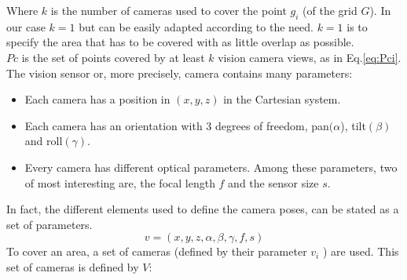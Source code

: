 \noindent Where $k$ is the number of cameras used to cover the point $g_i$ (of the grid $G$). In our case $k=1$ but can be easily adapted according to the need. $k=1$ is to specify the area that has to be covered with as little overlap as possible.\\
$Pc$ is the set of points covered by at least $k$ vision camera views, as in Eq.\eqref{eq:Pci}. \\

The vision sensor or, more precisely, camera contains many parameters:
\begin{itemize}
\item Each camera has a position  in  $(x, y, z)$ in the Cartesian system.
\item Each camera  has an  orientation with 3 degrees of freedom, pan$(\alpha$),  tilt$(\beta)$ and roll$(\gamma)$.
\item Every camera has different optical parameters. Among these parameters, two of  most interesting are, the focal length $f$ and the sensor size $s$. 
\end{itemize}

% 
In fact, the different elements used to define the camera poses, can be stated as a set of parameters.\\
 
\begin{equation}\label{eq:v}
v=(x,y,z,\alpha ,\beta,\gamma,f,s)
\end{equation}
To cover an area, a set of cameras (defined by their parameter $v_i$ ) are used. This set of cameras is defined by $V$:


